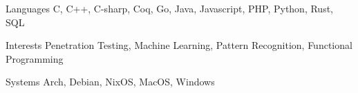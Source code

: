 
\begin{cvskills}
  \cvskill
    {Languages}
    {C, C++, C-sharp, Coq, Go, Java, Javascript, PHP, Python, Rust, SQL}

  \cvskill
    {Interests}
    {Penetration Testing, Machine Learning, Pattern Recognition, Functional Programming}

  \cvskill
    {Systems}
    {Arch, Debian, NixOS, MacOS, Windows}
\end{cvskills}
